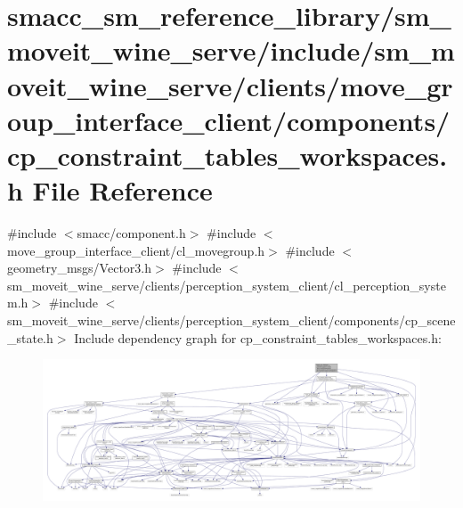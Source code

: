 \hypertarget{sm__moveit__wine__serve_2include_2sm__moveit__wine__serve_2clients_2move__group__interface__clie6d2e3587b1a2fb9791e157eb08739678}{}\section{smacc\+\_\+sm\+\_\+reference\+\_\+library/sm\+\_\+moveit\+\_\+wine\+\_\+serve/include/sm\+\_\+moveit\+\_\+wine\+\_\+serve/clients/move\+\_\+group\+\_\+interface\+\_\+client/components/cp\+\_\+constraint\+\_\+tables\+\_\+workspaces.h File Reference}
\label{sm__moveit__wine__serve_2include_2sm__moveit__wine__serve_2clients_2move__group__interface__clie6d2e3587b1a2fb9791e157eb08739678}
{\ttfamily \#include $<$smacc/component.\+h$>$}\newline
{\ttfamily \#include $<$move\+\_\+group\+\_\+interface\+\_\+client/cl\+\_\+movegroup.\+h$>$}\newline
{\ttfamily \#include $<$geometry\+\_\+msgs/\+Vector3.\+h$>$}\newline
{\ttfamily \#include $<$sm\+\_\+moveit\+\_\+wine\+\_\+serve/clients/perception\+\_\+system\+\_\+client/cl\+\_\+perception\+\_\+system.\+h$>$}\newline
{\ttfamily \#include $<$sm\+\_\+moveit\+\_\+wine\+\_\+serve/clients/perception\+\_\+system\+\_\+client/components/cp\+\_\+scene\+\_\+state.\+h$>$}\newline
Include dependency graph for cp\+\_\+constraint\+\_\+tables\+\_\+workspaces.\+h\+:
\nopagebreak
\begin{figure}[H]
\begin{center}
\leavevmode
\includegraphics[width=350pt]{sm__moveit__wine__serve_2include_2sm__moveit__wine__serve_2clients_2move__group__interface__clie85e81bed048c12047fb2f60b7c78b2d3}
\end{center}
\end{figure}
